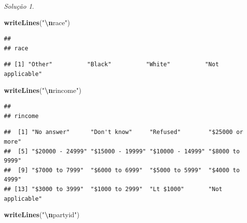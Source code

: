 \documentclass[
]{latex/krantz}
\newenvironment{Shaded}{\begin{snugshade}}{\end{snugshade}}
\newcommand{\FunctionTok}[1]{\textcolor[rgb]{0.13,0.29,0.53}{\textbf{#1}}}
\newcommand{\NormalTok}[1]{#1}
\newcommand{\SpecialCharTok}[1]{\textcolor[rgb]{0.81,0.36,0.00}{\textbf{#1}}}
\newcommand{\StringTok}[1]{\textcolor[rgb]{0.31,0.60,0.02}{#1}}
\theoremstyle{definition}
\theoremstyle{definition}
\theoremstyle{definition}
\theoremstyle{definition}
\theoremstyle{remark}
\newtheorem*{solution}{Solução}
\begin{document}
\begin{solution}
\begin{Shaded}
\begin{Highlighting}[]
\FunctionTok{writeLines}\NormalTok{(}\StringTok{"}\SpecialCharTok{\textbackslash{}n}\StringTok{race"}\NormalTok{)}
\end{Highlighting}
\end{Shaded}

\begin{verbatim}
## 
## race
\end{verbatim}

\begin{Shaded}
\end{Shaded}

\begin{verbatim}
## [1] "Other"          "Black"          "White"          "Not applicable"
\end{verbatim}

\begin{Shaded}
\begin{Highlighting}[]
\FunctionTok{writeLines}\NormalTok{(}\StringTok{"}\SpecialCharTok{\textbackslash{}n}\StringTok{rincome"}\NormalTok{)}
\end{Highlighting}
\end{Shaded}

\begin{verbatim}
## 
## rincome
\end{verbatim}

\begin{Shaded}
\end{Shaded}

\begin{verbatim}
##  [1] "No answer"      "Don't know"     "Refused"        "$25000 or more"
##  [5] "$20000 - 24999" "$15000 - 19999" "$10000 - 14999" "$8000 to 9999" 
##  [9] "$7000 to 7999"  "$6000 to 6999"  "$5000 to 5999"  "$4000 to 4999" 
## [13] "$3000 to 3999"  "$1000 to 2999"  "Lt $1000"       "Not applicable"
\end{verbatim}

\begin{Shaded}
\begin{Highlighting}[]
\FunctionTok{writeLines}\NormalTok{(}\StringTok{"}\SpecialCharTok{\textbackslash{}n}\StringTok{partyid"}\NormalTok{)}
\end{Highlighting}
\end{Shaded}


\end{solution}
\end{document}
